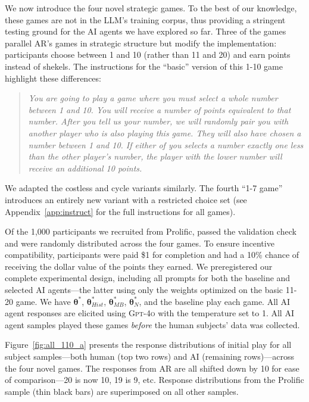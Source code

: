 \documentclass[11pt]{article}
\theoremstyle{definition}
\newcommand{\aisub}{AI agent}
\begin{document}
We now introduce the four novel strategic games.
To the best of our knowledge, these games are not in the LLM's training corpus, thus providing a stringent testing ground for the \aisub{s} we have explored so far.
Three of the games parallel AR's games in strategic structure but modify the implementation: participants choose between 1 and 10 (rather than 11 and 20) and earn points instead of shekels.
The instructions for the ``basic'' version of this 1-10 game highlight these differences:
\begin{quote}
\vspace{-.5cm}
\singlespacing
\emph{You are going to play a game where you must select a whole number between 1 and 10.
You will receive a number of points equivalent to that number.
After you tell us your number, we will randomly pair you with another player who is also playing this game. They will also have chosen a number between 1 and 10.
If either of you selects a number exactly one less than the other player's number, the player with the lower number will receive an additional 10 points.}
\end{quote}
We adapted the costless and cycle variants similarly.
The fourth ``1-7 game'' introduces an entirely new variant with a restricted choice set (see Appendix~\ref{app:instruct} for the full instructions for all games). 

Of the 1,000 participants we recruited from Prolific, \NTotal{} passed the validation check and were randomly distributed across the four games.
To ensure incentive compatibility, participants were paid \$1 for completion and had a 10\% chance of receiving the dollar value of the points they earned.
We preregistered our complete experimental design, including all prompts for both the baseline and selected \aisub{s}---the latter using only the weights optimized on the basic 11-20 game.
We have $\bm{\theta}^*$, $\bm{\theta}^*_{Hist}$, $\bm{\theta}^*_{MB}$, $\bm{\theta}^*_{N}$, and the baseline play each game.
All \aisub{} responses are elicited using \textsc{Gpt-4o} with the temperature set to 1.
All \aisub{} samples played these games \emph{before} the human subjects' data was collected.

Figure~\ref{fig:all_110_a} presents the response distributions of initial play for all subject samples---both human (top two rows) and AI (remaining rows)---across the four novel games. 
The responses from AR are all shifted down by 10 for ease of comparison---20 is now 10, 19 is 9, etc.
Response distributions from the Prolific sample (thin black bars) are superimposed on all other samples.
\end{document}

